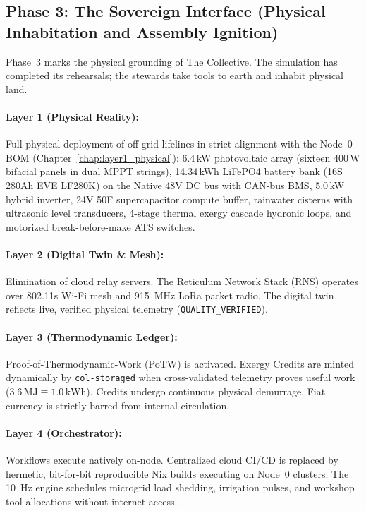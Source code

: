 \subsection{Phase 3: The Sovereign Interface (Physical Inhabitation and Assembly Ignition)}
\label{subsec:phase3_interface}

Phase~3 marks the physical grounding of The Collective. The simulation has completed its rehearsals; the stewards take tools to earth and inhabit physical land.

\paragraph{Layer 1 (Physical Reality):} Full physical deployment of off-grid lifelines in strict alignment with the Node~0 BOM (Chapter~\ref{chap:layer1_physical}): 6.4\,kW photovoltaic array (sixteen 400\,W bifacial panels in dual MPPT strings), 14.34\,kWh LiFePO4 battery bank (16S 280Ah EVE LF280K) on the Native 48V DC bus with CAN-bus BMS, 5.0\,kW hybrid inverter, 24V 50F supercapacitor compute buffer, rainwater cisterns with ultrasonic level transducers, 4-stage thermal exergy cascade hydronic loops, and motorized break-before-make ATS switches.
\paragraph{Layer 2 (Digital Twin \& Mesh):} Elimination of cloud relay servers. The Reticulum Network Stack (RNS) operates over 802.11s Wi-Fi mesh and 915~MHz LoRa packet radio. The digital twin reflects live, verified physical telemetry (\texttt{QUALITY\_VERIFIED}).
\paragraph{Layer 3 (Thermodynamic Ledger):} Proof-of-Thermodynamic-Work (PoTW) is activated. Exergy Credits are minted dynamically by \texttt{col-storaged} when cross-validated telemetry proves useful work ($3.6\,\mathrm{MJ} \equiv 1.0\,\mathrm{kWh}$). Credits undergo continuous physical demurrage. Fiat currency is strictly barred from internal circulation.
\paragraph{Layer 4 (Orchestrator):} Workflows execute natively on-node. Centralized cloud CI/CD is replaced by hermetic, bit-for-bit reproducible Nix builds executing on Node~0 clusters. The 10~Hz engine schedules microgrid load shedding, irrigation pulses, and workshop tool allocations without internet access.
